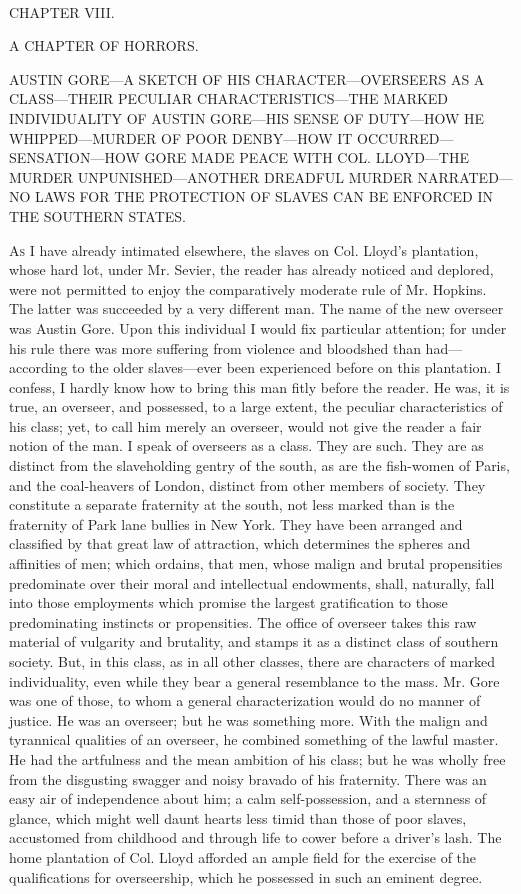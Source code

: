 {}

~

{CHAPTER VIII.}

A CHAPTER OF HORRORS.

{AUSTIN GORE---A SKETCH OF HIS CHARACTER---OVERSEERS AS A CLASS---THEIR
PECULIAR CHARACTERISTICS---THE MARKED INDIVIDUALITY OF AUSTIN GORE---HIS
SENSE OF DUTY---HOW HE WHIPPED---MURDER OF POOR DENBY---HOW IT
OCCURRED---SENSATION---HOW GORE MADE PEACE WITH COL. LLOYD---THE MURDER
UNPUNISHED---ANOTHER DREADFUL MURDER NARRATED---NO LAWS FOR THE
PROTECTION OF SLAVES CAN BE ENFORCED IN THE SOUTHERN STATES.}

\textsc{As} I have already intimated elsewhere, the slaves on Col.
Lloyd's plantation, whose hard lot, under Mr. Sevier, the reader has
already noticed and deplored, were not permitted to enjoy the
comparatively moderate rule of Mr. Hopkins. The latter was succeeded by
a very different man. The name of the new overseer was Austin Gore. Upon
this individual I would fix particular attention; for under his rule
there was more suffering from violence and bloodshed than
had---according to the older slaves---ever been experienced before on
this plantation. I confess, I hardly know how to bring this man fitly
before the reader. He was, it is true, an overseer, and possessed, to a
large extent, the peculiar characteristics of his class; yet, to call
him merely an overseer, would not give the reader a fair notion of the
man. I speak of overseers as a class. They are such. They are as
distinct from the slaveholding gentry of the south, as are the
fish-women of Paris, and the coal-heavers of {}London, distinct from
other members of society. They constitute a separate fraternity at the
south, not less marked than is the fraternity of Park lane bullies in
New York. They have been arranged and classified by that great law of
attraction, which determines the spheres and affinities of men; which
ordains, that men, whose malign and brutal propensities predominate over
their moral and intellectual endowments, shall, naturally, fall into
those employments which promise the largest gratification to those
predominating instincts or propensities. The office of overseer takes
this raw material of vulgarity and brutality, and stamps it as a
distinct class of southern society. But, in this class, as in all other
classes, there are characters of marked individuality, even while they
bear a general resemblance to the mass. Mr. Gore was one of those, to
whom a general characterization would do no manner of justice. He was an
overseer; but he was something more. With the malign and tyrannical
qualities of an overseer, he combined something of the lawful master. He
had the artfulness and the mean ambition of his class; but he was wholly
free from the disgusting swagger and noisy bravado of his fraternity.
There was an easy air of independence about him; a calm self-possession,
and a sternness of glance, which might well daunt hearts less timid than
those of poor slaves, accustomed from childhood and through life to
cower before a driver's lash. The home plantation of Col. Lloyd afforded
an ample field for the exercise of the qualifications for overseership,
which he possessed in such an eminent degree.

